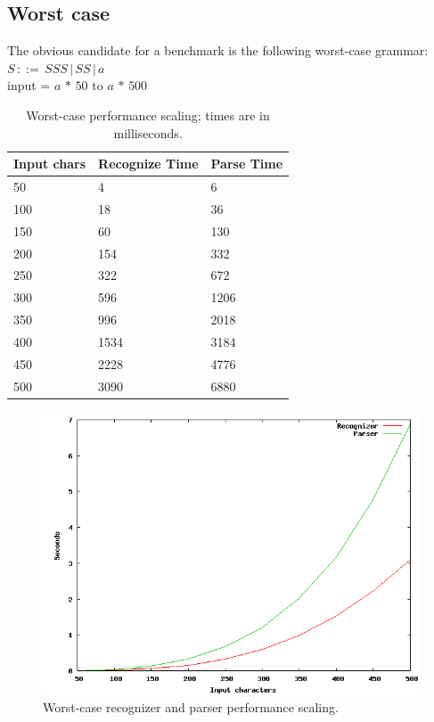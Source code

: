 \documentclass[a4paper,10pt]{article}
\begin{document}
\subsection{Worst case}

The obvious candidate for a benchmark is the following worst-case grammar:
$S\,::=\,SSS\,|\,SS\,|\,a$\\
input = $a\,*\,50$ to $a\,*\,500$

\begin{table}[H]
\centering
\begin{tabular}{ | p{5em} | p{7em} | p{6em} | }
  \hline
  Input chars & Recognize Time & Parse Time \\
  \hline
  50 & 4 & 6 \\
  100 & 18 & 36 \\
  150 & 60 & 130 \\
  200 & 154 & 332 \\
  250 & 322 & 672 \\
  300 & 596 & 1206 \\
  350 & 996 & 2018 \\
  400 & 1534 & 3184 \\
  450 & 2228 & 4776 \\
  500 & 3090 & 6880 \\
  \hline
\end{tabular}
\caption{Worst-case performance scaling; times are in milliseconds.}
\end{table}

\begin{figure}[H]
\centering
\includegraphics[scale=0.5]{worst-case.png}
\caption{Worst-case recognizer and parser performance scaling.}
\end{figure}
\end{document}
